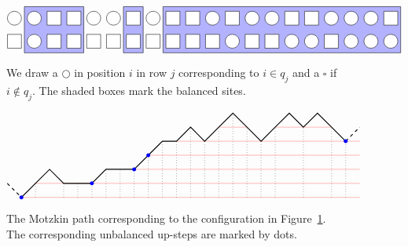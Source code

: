 \documentclass[reqno]{amsart}
\newcommand{\0}{\phantom{c}}
\theoremstyle{plain}
\theoremstyle{definition}
\numberwithin{equation}{section}
\begin{document}
\begin{figure}[t]
\[
\begin{tikzpicture}[scale=0.75]
  \def\sc{0.85}   %
  \def\ll{2}   %
  \def\l{1}   %
  \draw[fill=blue!30] (1.5*\sc,\l-.5) rectangle(4.5*\sc,\ll+.5);
  \draw[fill=blue!30] (6.5*\sc,\l-.5) rectangle(7.5*\sc,\ll+.5);
  \draw[fill=blue!30] (8.5*\sc,\l-.5) rectangle(20.5*\sc,\ll+.5);
  \foreach \i in {1,2,5,6,8,11,13,14,17,18,19} { \draw[fill=white] (\i*\sc,\ll) circle (0.3); }
  \foreach \i in {3,4,7,9,10,12,15,16,20} { \draw[fill=white] (\i*\sc-.3,\ll-.3) rectangle +(0.6,+0.6); }
  \foreach \i in {2,12,15,16,18,19,20} { \draw[fill=white] (\i*\sc,\l) circle (0.3); }
  \foreach \i in {1,3,4,5,6,7,8,9,10,11,13,14,17} { \draw[fill=white] (\i*\sc-.3,\l-.3) rectangle +(0.6,+0.6); }
\end{tikzpicture}
\]
\caption{We draw a $\bigcirc$ in position $i$ in row $j$ corresponding to $i \in q_j$ and a $\square$ if $i \notin q_j$.
The shaded boxes mark the balanced sites.}
\label{fig:balanced}
\end{figure}

\begin{figure}[t]
\[
\begin{tikzpicture}[scale=0.45]
\draw[-,thin,red!50] (0,0) -- (24,0);
\draw[-,thin,red!50] (1,1) -- (24,1);
\draw[-,thin,red!50] (8,2) -- (24,2);
\draw[-,thin,red!50] (9,3) -- (24,3);
\draw[-,thin,red!50] (11,4) -- (24,4);
\draw[-,thin,red!50] (14,5) -- (16,5);
\draw[-,thin,red!50] (18,5) -- (22,5);
\draw[-,thick,dashed] (-1,1) -- (0,0);
\draw[-,dotted] (1,0) -- (1,1);
\draw[-,dotted] (3,0) -- (3,1);
\draw[-,dotted] (4,0) -- (4,1);
\draw[-,dotted] (5,0) -- (5,1);
\draw[-,dotted] (6,0) -- (6,2);
\draw[-,dotted] (7,0) -- (7,2);
\draw[-,dotted] (8,0) -- (8,2);
\draw[-,dotted] (9,0) -- (9,3);
\draw[-,dotted] (10,0) -- (10,4);
\draw[-,dotted] (11,0) -- (11,4);
\draw[-,dotted] (12,0) -- (12,5);
\draw[-,dotted] (13,0) -- (13,4);
\draw[-,dotted] (14,0) -- (14,5);
\draw[-,dotted] (15,0) -- (15,6);
\draw[-,dotted] (16,0) -- (16,5);
\draw[-,dotted] (17,0) -- (17,4);
\draw[-,dotted] (18,0) -- (18,5);
\draw[-,dotted] (20,0) -- (20,5);
\draw[-,dotted] (22,0) -- (22,5);
\draw[-,dotted] (23,0) -- (23,4);
\draw[-,thick] (0,0) -- (1,1) -- (2,2) -- (3,1) -- (4,1) -- (5,1) -- (6,2) -- (7,2) -- (8,2) -- (9,3) -- (10,4) -- (11,4) -- (12,5) -- (13,4) -- (14,5) -- (15,6) -- (16,5) -- (17,4) -- (18,5) -- (19,6) -- (20,5) -- (21,6) -- (22,5) -- (23,4);
\draw[-,thick,dashed] (23,4) -- (24,5);
\fill[blue] (0,0) circle (4pt);
\fill[blue] (5,1) circle (4pt);
\fill[blue] (8,2) circle (4pt);
\fill[blue] (9,3) circle (4pt);
\fill[blue] (23,4) circle (4pt);
\end{tikzpicture}
\]
\caption{The Motzkin path corresponding to the configuration in Figure~\ref{fig:balanced}.
The corresponding unbalanced up-steps are marked by dots.}
\label{fig:balanced_motzkin}
\end{figure}
\end{document}
